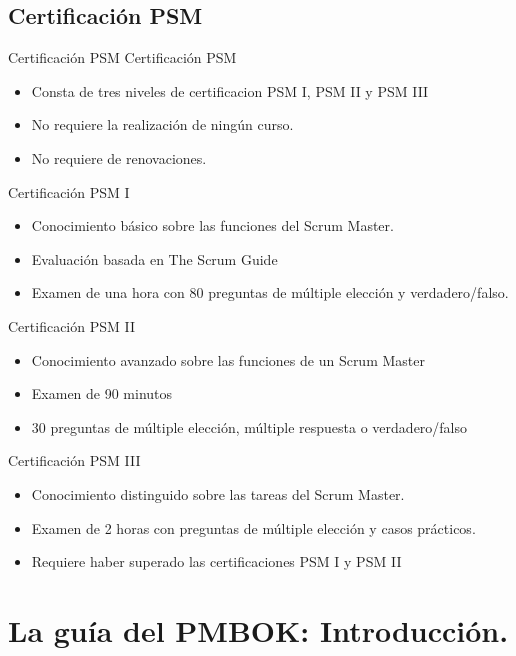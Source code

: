 \subsection{Certificación PSM}
\begin{frame}[allowframebreaks]{Certificación PSM}
	Certificación PSM 

	\begin{itemize}
		\item Consta de tres niveles de certificacion PSM I, PSM II y PSM III
		\item No requiere la realización de ningún curso.
		\item No requiere de renovaciones.
	\end{itemize}

	\framebreak

	Certificación PSM I
	\begin{itemize}
		\item Conocimiento básico sobre las funciones del Scrum Master.
		\item Evaluación basada en The Scrum Guide
		\item Examen de una hora con 80 preguntas de múltiple elección y verdadero/falso.
	\end{itemize}

	\framebreak

	Certificación PSM II
	\begin{itemize}
		\item Conocimiento avanzado sobre las funciones de un Scrum Master
		\item Examen de 90 minutos
		\item 30 preguntas de múltiple elección, múltiple respuesta o verdadero/falso
	\end{itemize}

	\framebreak

	Certificación PSM III
	\begin{itemize}
		\item Conocimiento distinguido sobre las tareas del Scrum Master.
		\item Examen de 2 horas con preguntas de múltiple elección y casos prácticos.
		\item Requiere haber superado las certificaciones PSM I y PSM II
	\end{itemize}


\end{frame}

\section{La guía del PMBOK: Introducción.}

